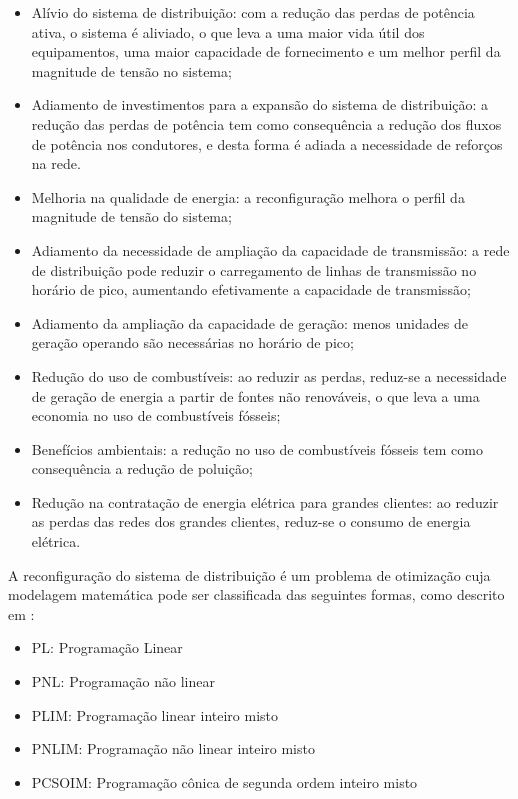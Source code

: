 \begin{itemize}
    \item Alívio do sistema de distribuição: com a redução das perdas de potência ativa, o sistema é aliviado, o que leva a uma maior vida útil dos equipamentos, uma maior capacidade de fornecimento e um melhor perfil da magnitude de tensão no sistema;

    \item Adiamento de investimentos para a expansão do sistema de distribuição: a redução das perdas de potência tem como consequência a redução dos fluxos de potência nos condutores, e desta forma é adiada a necessidade de reforços na rede.
    
    \item Melhoria na qualidade de energia: a reconfiguração melhora o perfil da magnitude de tensão do sistema;
    
    \item Adiamento da necessidade de ampliação da capacidade de transmissão: a rede de distribuição pode reduzir o carregamento de linhas de transmissão no horário de pico, aumentando efetivamente a capacidade de transmissão;
    
    \item Adiamento da ampliação da capacidade de geração: menos unidades de geração operando são necessárias no horário de pico;
    
    \item Redução do uso de combustíveis: ao reduzir as perdas, reduz-se a necessidade de geração de energia a partir de fontes não renováveis, o que leva a uma economia no uso de combustíveis fósseis;
    
    \item Benefícios ambientais: a redução no uso de combustíveis fósseis tem como consequência a redução de poluição;
    
    \item Redução na contratação de energia elétrica para grandes clientes: ao reduzir as perdas das redes dos grandes clientes, reduz-se o consumo de energia elétrica.
\end{itemize}

A reconfiguração do sistema de distribuição é um problema de otimização cuja modelagem matemática pode ser classificada das seguintes formas, como descrito em \cite{Goncalves2013ModelosRadiais}:

\begin{itemize}
    \item PL: Programação Linear
    
    \item PNL: Programação não linear
    
    \item PLIM: Programação linear inteiro misto
    
    \item PNLIM: Programação não linear inteiro misto
    
    \item PCSOIM: Programação cônica de segunda ordem inteiro misto
\end{itemize}

